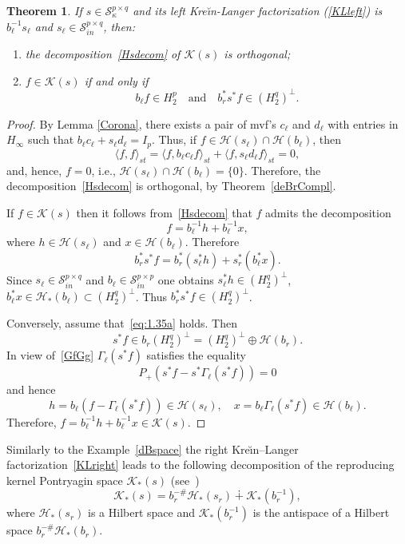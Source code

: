 \documentclass[12pt,twoside,a4paper]{amsart}
\newtheorem{thm}{Theorem}[section]
\theoremstyle{definition}
\numberwithin{equation}{section}
\begin{document}
\begin{thm}\label{Hsinner}
If $s \in {\mathcal S}_{\kappa}^{p\times q}$ and its left
Kre\u{\i}n-Langer factorization (\ref{KLleft}) is
$b_\ell^{-1}s_\ell$ and $s_{\ell} \in {\mathcal S}_{in}^{p\times q}$,
then:
\begin{enumerate}
\item[\rm(1)]
the decomposition~\eqref{Hsdecom} of ${{\mathcal K}}(s)$ is orthogonal; \vskip 6pt
\item[\rm(2)]
$f\in{{\mathcal K}}(s)$ if and only if
\begin{equation}\label{eq:1.35a}
    b_{\ell}f\in H_2^p\quad \textrm{and}\quad b_r^*s^*f\in(H_2^q)^\perp.
\end{equation}
\end{enumerate}
\end{thm}
\begin{proof}
By Lemma \ref{Corona},
there exists a pair of mvf's $c_\ell$ and $d_\ell$ with entries in
$H_\infty$ such that
$b_{\ell}c_\ell+s_{\ell}d_\ell=I_p$. Thus, if
$f\in{{\mathcal H}}(s_{\ell})\cap{{\mathcal H}}(b_{\ell})$,
then
\[
\langle f,f\rangle_{st}=\langle f,b_{\ell}c_{\ell}f\rangle_{st}+\langle
f,s_{\ell}d_{\ell}f\rangle_{st}=0,
\]
and, hence, $f=0$, i.e., ${{\mathcal H}}(s_{\ell})\cap{{\mathcal H}}(b_{\ell})=\{0\}$. Therefore,
the decomposition~\eqref{Hsdecom} is orthogonal, by
Theorem~\ref{deBrCompl}.

If $f\in{{\mathcal K}}(s)$ then it follows from~\eqref{Hsdecom} that $f$
admits the decomposition
\begin{equation}\label{eq:1.36}
    f=b_{\ell}^{-1}h+b_{\ell}^{-1}x,
\end{equation}
where $h\in{{\mathcal H}}(s_{\ell})$ and $x\in{{\mathcal H}}(b_{\ell})$. Therefore
\[
b_r^*s^*f=b_r^*(s_{\ell}^*h)+s_r^*(b_{\ell}^*x).
\]
Since $s_{\ell}\in {\mathcal S}_{in}^{p\times q}$ and $b_{\ell}\in
{\mathcal S}_{in}^{p\times p}$ one obtains
$s_{\ell}^*h\in(H_2^q)^\perp$, 
$b_{\ell}^*x\in{{\mathcal H}}_*(b_{\ell})\subset(H_2^q)^\perp$. Thus
$b_r^*s^*f\in(H_2^q)^\perp$.

Conversely, assume that~\eqref{eq:1.35a} holds. Then
\[
s^*f\in b_r(H_2^q)^\perp=(H_2^q)^\perp\oplus{{\mathcal H}}(b_r).
\]
In view of~\eqref{GfGg} $\Gamma_\ell(s^*f)$ satisfies the equality
\[
P_+(s^*f-s^*\Gamma_\ell(s^*f))=0
\]
and hence
\[
h=b_\ell(f-\Gamma_\ell(s^*f))\in{{\mathcal H}}(s_{\ell}),\quad
x=b_\ell\Gamma_\ell(s^*f)\in{{\mathcal H}}(b_{\ell}).
\]
Therefore, $f=b_{\ell}^{-1}h+b_{\ell}^{-1}x\in{{\mathcal K}}(s)$.
\end{proof}
Similarly to the Example~\ref{dBspace} the right Kre\u{\i}n--Langer
factorization~\eqref{KLright} leads to the following  decomposition
of the reproducing kernel Pontryagin space ${{\mathcal K}}_*(s)$
(see~\cite[Theorem~4.2.3]{ADRS})
\begin{equation}\label{Hsdecom*}
    {{\mathcal K}}_*(s)=b_r^{-\#}{{\mathcal H}}_*(s_r)\dotplus {{\mathcal K}}_*(b_r^{-1}),
\end{equation}
where ${{\mathcal H}}_*(s_r)$ is a Hilbert space  and ${{\mathcal K}}_*(b_r^{-1})$ is
the antispace of a Hilbert space $b_r^{-\#}{{\mathcal H}}_*(b_r)$.
\end{document}
